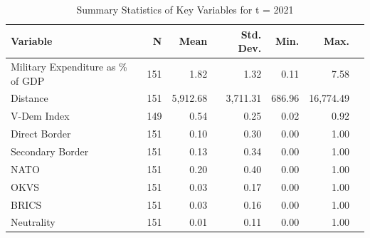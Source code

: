 \documentclass[12pt,a4paper]{article}
\begin{document}
\begin{table}[h]
\label{t:1}
\caption{Summary Statistics of Key Variables for t = 2021}
\begin{tabular}{lrrrrrr}
\hline \hline
Variable & N & Mean & Std. Dev. & Min. & Max. \\ \hline
Military Expenditure as \% of GDP & 151 & 1.82 & 1.32 & 0.11 & 7.58 \\
Distance &   151  &  5,912.68 &   3,711.31 & 686.96 &  16,774.49 \\
V-Dem Index & 149 & 0.54& 0.25 & 0.02 & 0.92 \\
Direct Border & 151 & 0.10 & 0.30 & 0.00 & 1.00 \\
Secondary Border & 151 & 0.13 & 0.34 & 0.00 &          1.00 \\
NATO & 151& 0.20 & 0.40 & 0.00 & 1.00 \\         
OKVS & 151 & 0.03  & 0.17 & 0.00 & 1.00 \\
BRICS & 151  & 0.03 & 0.16 & 0.00 & 1.00 \\          
Neutrality & 151   &  0.01 &   0.11 & 0.00 & 1.00 \\     \hline\hline
\end{tabular}
\end{table}
 
\end{document}

